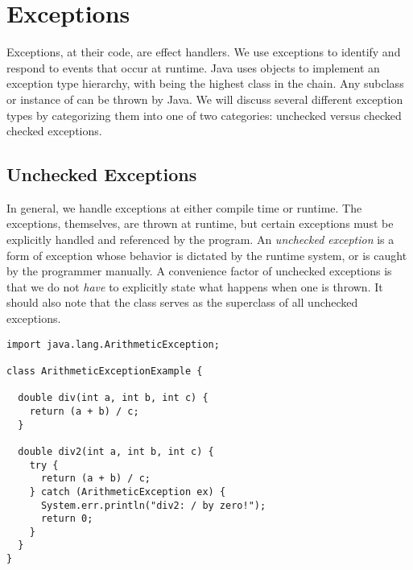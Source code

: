 \section{Exceptions}

Exceptions, at their code, are effect handlers. We use exceptions to identify and respond to events that occur at runtime. Java uses objects to implement an exception type hierarchy, with  being the highest class in the chain. Any subclass or instance of  can be thrown by Java. We will discuss several different exception types by categorizing them into one of two categories: unchecked versus checked checked exceptions.

\subsection{Unchecked Exceptions}
In general, we handle exceptions at either compile time or runtime. The exceptions, themselves, are thrown at runtime, but certain exceptions must be explicitly handled and referenced by the program. An \emph{unchecked exception} is a form of exception whose behavior is dictated by the runtime system, or is caught by the programmer manually. A convenience factor of unchecked exceptions is that we do not \emph{have} to explicitly state what happens when one is thrown. It should also note that the  class serves as the superclass of all unchecked exceptions.


\begin{cl}[]{}
\begin{lstlisting}[language=MyJava]
import java.lang.ArithmeticException;

class ArithmeticExceptionExample {
  
  double div(int a, int b, int c) {
    return (a + b) / c;
  }

  double div2(int a, int b, int c) {
    try {
      return (a + b) / c;
    } catch (ArithmeticException ex) {
      System.err.println("div2: / by zero!");
      return 0;
    }
  }
} 
\end{lstlisting}
\end{cl}

